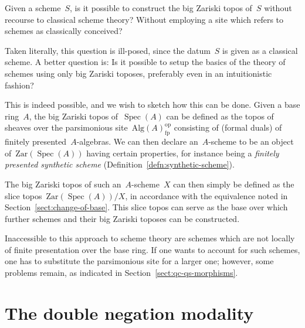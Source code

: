 \documentclass[10pt,reqno,a4paper]{amsbook}
\theoremstyle{definition}
\theoremstyle{plain}
\theoremstyle{remark}
\newcommand{\Zar}{\mathrm{Zar}}
\newcommand{\Alg}{\mathrm{Alg}}
\newcommand{\fp}{\mathrm{fp}}
\DeclareMathOperator{\Spec}{Spec}
\newcommand{\op}{\mathrm{op}}
\newcommand{\?}{\,{:}\,}
\renewcommand{\_}{\mathpunct{.}\,}
\begin{document}
Given a scheme~$S$, is it possible to construct the big Zariski topos of~$S$
without recourse to classical scheme theory? Without employing a site which
refers to schemes as classically conceived?

Taken literally, this question is ill-posed, since the datum~$S$ is given as a
classical scheme. A better question is: Is it possible to setup the basics of
the theory of schemes using only big Zariski toposes, preferably even in an
intuitionistic fashion?

This is indeed possible, and we wish to sketch how this can be done. Given a
base ring~$A$, the big Zariski topos of~$\Spec(A)$ can be defined as the topos
of sheaves over the parsimonious site~$\Alg(A)_\fp^\op$ consisting of (formal
duals) of finitely presented~$A$-algebras. We can then declare an~$A$-scheme to
be an object of~$\Zar(\Spec(A))$ having certain properties, for instance being
a \emph{finitely presented synthetic scheme}
(Definition~\ref{defn:synthetic-scheme}).

The big Zariski topos of such an~$A$-scheme~$X$ can then simply be defined as
the slice topos~$\Zar(\Spec(A))/X$, in accordance with the equivalence noted in
Section~\ref{sect:change-of-base}. This slice topos can serve as the base over
which further schemes and their big Zariski toposes can be constructed.

Inaccessible to this approach to scheme theory are schemes which are not
locally of finite presentation over the base ring. If one wants to account for
such schemes, one has to substitute the parsimonious site for a larger one;
however, some problems remain, as indicated in
Section~\ref{sect:qc-qs-morphisms}.


\section{The double negation modality}
\label{sect:double-negation-modality-big-zariski}
\end{document}
